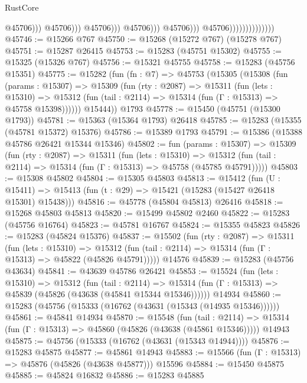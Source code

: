 \begin{lexlean}{RustCore}
\begin{coremodule}
                                                              @45706)))
                                                        @45706)))
                                                  @45706)))
                                            @45706)))
                                      @45706)))
                                @45706))))))))))))))
@45746 := @15266 @767
@45750 := @15268 (@15272 @767) (@15278 @767)
@45751 := @15287 @26415
@45753 := @15283 (@45751 @15302)
@45755 := @15325 (@15326 @767)
@45756 := @15321 @45755
@45758 := @15283 (@45756 @15351)
@45775 := @15282
    (fun (fn : @7) =>
    @45753
      (@15305
        (@15308
          (fun (params : @15307) =>
          @15309
            (fun (rty : @2087) =>
            @15311
              (fun (lets : @15310) =>
              @15312 (fun (tail : @2114) => @15314 (fun (Γ : @15313) => @45758 @15398))))))
        @15444))
    @1793
@45778 := @15450 (@45751 (@15300 @1793))
@45781 := @15363 (@15364 @1793) @26418
@45785 := @15283 (@15355 (@45781 @15372) @15376)
@45786 := @15389 @1793
@45791 := @15386 (@15388 @45786 @26421 @15344 @15346)
@45802 := fun (params : @15307) =>
  @15309
    (fun (rty : @2087) =>
    @15311
      (fun (lets : @15310) =>
      @15312 (fun (tail : @2114) => @15314 (fun (Γ : @15313) => @45758 (@45785 @45791)))))
@45803 := @15308 @45802
@45804 := @15305 @45803
@45813 := @15412
    (fun (U : @15411) => @15413 (fun (t : @29) => @15421 (@15283 (@15427 @26418 @15301) @15438)))
@45816 := @45778 (@45804 @45813) @26416
@45818 := @15268 @45803 @45813
@45820 := @15499 @45802 @2460
@45822 := @15283 (@45756 @16764)
@45823 := @45781 @16767
@45824 := @15355 @45823
@45826 := @15283 (@45824 @15376)
@45837 := @15502
    (fun (rty : @2087) =>
    @15311
      (fun (lets : @15310) =>
      @15312 (fun (tail : @2114) => @15314 (fun (Γ : @15313) => @45822 (@45826 @45791)))))
    @14576
@45839 := @15283 (@45756 @43634)
@45841 := @43639 @45786 @26421
@45853 := @15524
    (fun (lets : @15310) =>
    @15312
      (fun (tail : @2114) =>
      @15314 (fun (Γ : @15313) => @45839 (@45826 (@43638 (@45841 @15344 @15346))))))
    @14934
@45860 := @15283 (@45756 (@15333 (@16762 (@43631 (@15343 (@14935 @15346))))))
@45861 := @45841 @14934
@45870 := @15548
    (fun (tail : @2114) => @15314 (fun (Γ : @15313) => @45860 (@45826 (@43638 (@45861 @15346)))))
    @14943
@45875 := @45756 (@15333 (@16762 (@43631 (@15343 @14944))))
@45876 := @15283 @45875
@45877 := @45861 @14943
@45883 := @15566 (fun (Γ : @15313) => @45876 (@45826 (@43638 @45877))) @15596
@45884 := @15450 @45875
@45885 := @45824 @16832
@45886 := @15283 @45885

\end{coremodule}
\end{lexlean}
